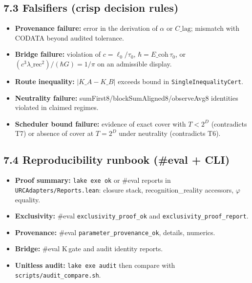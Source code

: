 \documentclass[11pt]{article}
\begin{document}
\subsection*{7.3 Falsifiers (crisp decision rules)}
\begin{itemize}[leftmargin=*]
  \item \textbf{Provenance failure:} error in the derivation of $\alpha$ or $C\_{\!\mathrm{lag}}$; mismatch with CODATA beyond audited tolerance.
  \item \textbf{Bridge failure:} violation of $c=\ell_0/\tau_0$, $\hbar=E\_{\!\mathrm{coh}}\,\tau_0$, or $(c^3\lambda\_{\!\mathrm{rec}}^2)/(\hbar G)=1/\pi$ on an admissible display.
  \item \textbf{Route inequality:} $|K\_A-K\_B|$ exceeds bound in \texttt{SingleInequalityCert}.
  \item \textbf{Neutrality failure:} sumFirst8/blockSumAligned8/observeAvg8 identities violated in claimed regimes.
  \item \textbf{Scheduler bound failure:} evidence of exact cover with $T<2^D$ (contradicts T7) or absence of cover at $T=2^D$ under neutrality (contradicts T6).
\end{itemize}

\subsection*{7.4 Reproducibility runbook (\#eval + CLI)}
\begin{itemize}[leftmargin=*]
  \item \textbf{Proof summary:} \texttt{lake exe ok} or \#eval reports in \texttt{URCAdapters/Reports.lean}: closure stack, recognition\_reality accessors, $\varphi$ equality.
  \item \textbf{Exclusivity:} \#eval \texttt{exclusivity\_proof\_ok} and \texttt{exclusivity\_proof\_report}.
  \item \textbf{Provenance:} \#eval \texttt{parameter\_provenance\_ok}, details, numerics.
  \item \textbf{Bridge:} \#eval K\,gate and audit identity reports.
  \item \textbf{Unitless audit:} \texttt{lake exe audit} then compare with \texttt{scripts/audit\_compare.sh}.
\end{itemize}
\end{document}

